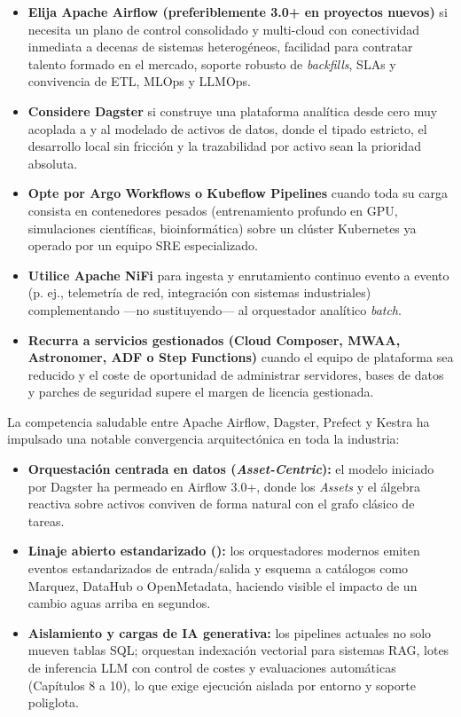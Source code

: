 \begin{examplebox}
\begin{itemize}
  \item \textbf{Elija Apache Airflow (preferiblemente 3.0+ en proyectos nuevos)} si necesita un plano de control consolidado y multi-cloud con conectividad inmediata a decenas de sistemas heterogéneos, facilidad para contratar talento formado en el mercado, soporte robusto de \textit{backfills}, SLAs y convivencia de ETL, MLOps y LLMOps.
  \item \textbf{Considere Dagster} si construye una plataforma analítica desde cero muy acoplada a  y al modelado de activos de datos, donde el tipado estricto, el desarrollo local sin fricción y la trazabilidad por activo sean la prioridad absoluta.
  \item \textbf{Opte por Argo Workflows o Kubeflow Pipelines} cuando toda su carga consista en contenedores pesados (entrenamiento profundo en GPU, simulaciones científicas, bioinformática) sobre un clúster Kubernetes ya operado por un equipo SRE especializado.
  \item \textbf{Utilice Apache NiFi} para ingesta y enrutamiento continuo evento a evento (p. ej., telemetría de red, integración con sistemas industriales) complementando ---no sustituyendo--- al orquestador analítico \textit{batch}.
  \item \textbf{Recurra a servicios gestionados (Cloud Composer, MWAA, Astronomer, ADF o Step Functions)} cuando el equipo de plataforma sea reducido y el coste de oportunidad de administrar servidores, bases de datos y parches de seguridad supere el margen de licencia gestionada.
\end{itemize}
\end{examplebox}

\begin{modernbox}
La competencia saludable entre Apache Airflow, Dagster, Prefect y Kestra ha impulsado una notable convergencia arquitectónica en toda la industria:
\begin{itemize}
  \item \textbf{Orquestación centrada en datos (\textit{Asset-Centric}):} el modelo iniciado por Dagster ha permeado en Airflow 3.0+, donde los \textit{Assets} y el álgebra reactiva sobre activos conviven de forma natural con el grafo clásico de tareas.
  \item \textbf{Linaje abierto estandarizado ():} los orquestadores modernos emiten eventos estandarizados de entrada/salida y esquema a catálogos como Marquez, DataHub o OpenMetadata, haciendo visible el impacto de un cambio aguas arriba en segundos.
  \item \textbf{Aislamiento y cargas de IA generativa:} los pipelines actuales no solo mueven tablas SQL; orquestan indexación vectorial para sistemas RAG, lotes de inferencia LLM con control de costes y evaluaciones automáticas (Capítulos 8 a 10), lo que exige ejecución aislada por entorno y soporte poliglota.
\end{itemize}
\end{modernbox}


